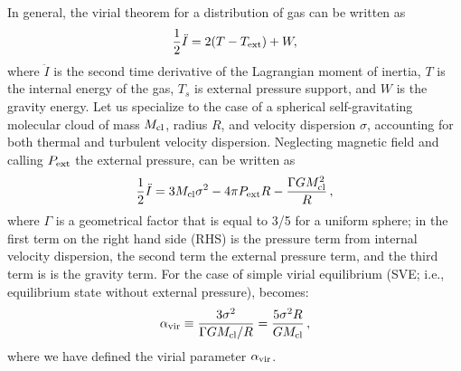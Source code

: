 \IfFileExists{emulateapjlegacy.cls}{\documentclass[iop]{emulateapjlegacy}}{\documentclass[iop]{emulateapj}}
\begin{document}
In general, the virial theorem for a distribution of gas can be written as
\begin{equation}\label{eqn:virial_th_general}
\frac{1}{2}\ddot I = 2(T - T_{\rm ext}) + W,
\end{equation}
where $\ddot I$ is the second time derivative of the Lagrangian moment of inertia, $T$ is the internal energy of the gas, $T_s$ is external pressure support, and $W$ is the gravity energy.
%
Let us specialize to the case of a spherical self-gravitating molecular cloud of mass $M_{\rm cl}$, radius $R$, and velocity dispersion $\sigma$, accounting for both thermal and turbulent velocity dispersion. Neglecting magnetic field and calling $P_{\rm ext}$ the external pressure,  can be written as
\begin{equation}
\frac{1}{2}\ddot I = 3 M_{\rm cl} \sigma^2 - 4\pi P_{\rm ext} R - \frac{\Gamma GM_{\rm cl}^2}{R}\,,
\label{eqn:virial}
\end{equation}
where $\Gamma$ is a geometrical factor that is equal to 3/5 for a uniform sphere; in  the first term on the right hand side (RHS) is the pressure term from internal velocity dispersion, the second term the external pressure term, and the third term is is the gravity term. For the case of simple virial equilibrium (SVE; i.e., equilibrium state without external pressure),  becomes:
\begin{equation}
\alpha_{\rm vir} \equiv \frac{3\sigma^2}{\Gamma GM_{\rm cl}/R} = \frac{5\sigma^2R}{GM_{\rm cl}}\,,
\label{eqn:alpha}
\end{equation}
where we have defined the virial parameter $\alpha_{\rm vir}$.
\end{document}
